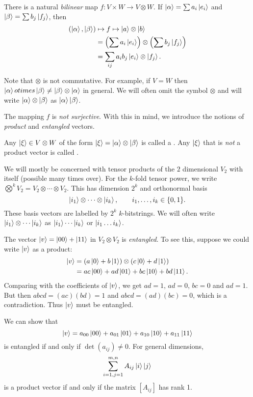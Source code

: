 \documentclass[a4paper]{article}
\begin{document}
There is a natural \emph{bilinear} map $f: V \times W \rightarrow V \otimes W$. If $\ket{\alpha} = \sum a_i \ket{e_i}$ and $\ket{\beta} = \sum b_j \ket{f_j}$, then
\begin{align*}
	(\ket{\alpha}, \ket{\beta}) &\mapsto f \mapsto \ket{a} \otimes \ket{b}\\
	&= \left(\sum a_i \ket{e_i}\right) \otimes \left(\sum b_j \ket{f_j}\right) \\
	&= \sum_{ij} a_i b_j \ket{e_i} \otimes \ket{f_j}.
\end{align*}

Note that $\otimes$ is not commutative. For example, if $V = W$ then $\ket{\alpha} otimes \ket{\beta} \neq \ket{\beta} \otimes \ket{\alpha}$ in general. We will often omit the symbol $\otimes$ and will write $\ket{\alpha} \otimes \ket{\beta}$ as $\ket{\alpha} \ket{\beta}$.

The mapping $f$ is \emph{not surjective}. 
With this in mind, we introduce the notions of \emph{product} and \emph{entangled} vectors.

\begin{definition}
	Any $\ket{\xi} \in V \otimes W$ of the form $\ket{\xi} = \ket{\alpha} \otimes \ket{\beta}$ is called a .
	Any $\ket{\xi}$ that is \emph{not} a product vector is called .
\end{definition}

We will mostly be concerned with tensor products of the $2$ dimensional $V_2$ with itself (possible many times over).
For the $k$-fold tensor power, we write $\bigotimes^k V_2 = V_2 \otimes \cdots \otimes V_2$. This has dimension $2^k$ and orthonormal basis
$$
\ket{i_1} \otimes \cdots \otimes \ket{i_k}, \quad \quad i_1, \dots, i_k \in \{0, 1\}.
$$
These basis vectors are labelled by $2^k$ $k$-bitstrings. We will often write $\ket{i_1} \otimes \cdots \ket{i_k}$ as $\ket{i_1} \cdots \ket{i_k}$ or $\ket{i_1 \dots i_k}$.

\begin{example}
	The vector $\ket{v} = \ket{00} + \ket{11}$ in $V_2 \otimes V_2$ is \emph{entangled}. To see this, suppose we could write $\ket{v}$ as a product:
	\begin{align*}
	\ket{v} &= (a\ket{0} + b\ket{1})\otimes(c\ket{0} + d\ket{1}) \\
		&= ac \ket{00} + ad \ket{01} + bc \ket{10} + bd \ket{11}.
\end{align*}
Comparing with the coefficients of $\ket{v}$, we get $ad = 1$, $ad = 0$, $bc = 0$ and $ad = 1$. But then $abcd = (ac)(bd) = 1$ and $abcd = (ad)(bc) = 0$, which is a contradiction. Thus $\ket{v}$ must be entangled.
\end{example}
We can show that
$$
\ket{v} = a_{00} \ket{00} +a_{01} \ket{01} +a_{10} \ket{10} +a_{11} \ket{11} 
$$
is entangled if and only if $\det(a_{ij}) \neq 0$. For general dimensions,
$$
\sum_{i = 1, j = 1}^{m, n} A_{ij} \ket{i} \ket{j}
$$
is a product vector if and only if the matrix $[A_{ij}]$ has rank 1.
\end{document}
